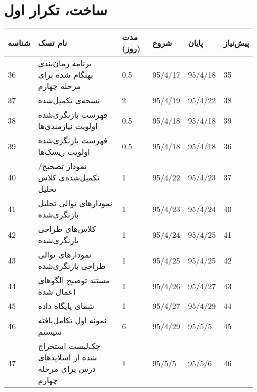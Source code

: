 \section{ساخت، تکرار اول}
\begin{tabular}[H]{ | l | l | l | l | l | l | }
	\hline
	شناسه & نام تسک & مدت (روز) & شروع & پایان & پیش‌نیاز    \\ \hline
	36 & برنامه زمان‌بندی بهنگام شده برای مرحله چهارم & 0.5   &   95/4/17 &   95/4/18 & 35    \\ \hline
	37 & نسخه‌ی تکمیل‌شده \lr{Usecase Realizations} & 2   &   95/4/19 &   95/4/22 & 38    \\ \hline
	38 &  فهرست بازنگری‌شده اولویت نیازمندی‌ها & 0.5   &   95/4/18 &   95/4/18 & 39    \\ \hline
	39 &  فهرست بازنگری‌شده اولویت ریسک‌ها & 0.5   &   95/4/18 &   95/4/18 & 36    \\ \hline
	40 & نمودار تصحیح/تکمیل‌شده‌ی کلاس تحلیل & 1   &   95/4/22 &   95/4/23 & 37    \\ \hline
	41 & نمودارهای توالی تحلیل بازنگری‌شده & 1   &   95/4/23 &   95/4/24 & 40    \\ \hline
	42 & کلاس‌های طراحی بازنگری‌شده & 1   &   95/4/24 &   95/4/25 & 41    \\ \hline
	43 & نمودارهای توالی طراحی بازنگری‌شده & 1   &   95/4/25 &   95/4/25 & 42    \\ \hline
	44 & مستند توضیح الگوهای اعمال شده & 1   &   95/4/26 &   95/4/27 & 43    \\ \hline
	45 & شمای پایگاه داده & 1   &   95/4/27 &   95/4/29 & 44    \\ \hline
	46 & نمونه اول تکامل‌یافته سیستم & 6   &   95/4/29 &   95/5/5 & 45    \\ \hline
	47 & چک‌‌لیست استخراج شده از اسلایدهای درس برای مرحله چهارم & 1   &   95/5/5 &   95/5/6 & 46    \\ \hline
\end{tabular}


